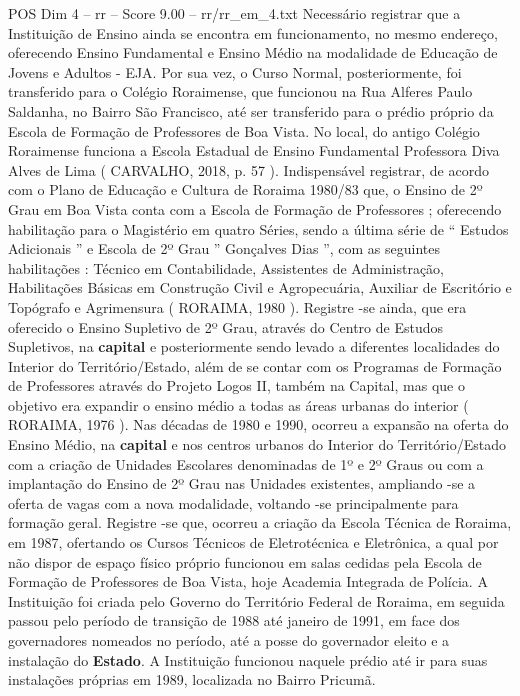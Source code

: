 \begin{textsample}{POS Dim 4 – rr – Score 9.00 – rr/rr\_em\_4.txt}
Necessário registrar que a Instituição de Ensino ainda se encontra em funcionamento, no mesmo endereço, oferecendo Ensino Fundamental e Ensino Médio na modalidade de Educação de Jovens e Adultos - EJA.
Por sua vez, o Curso Normal, posteriormente, foi transferido para o Colégio Roraimense, que funcionou na Rua Alferes Paulo Saldanha, no Bairro São Francisco, até ser transferido para o prédio próprio da Escola de Formação de Professores de Boa Vista.
No local, do antigo Colégio Roraimense funciona a Escola Estadual de Ensino Fundamental Professora Diva Alves de Lima ( CARVALHO, 2018, p. 57 ).
Indispensável registrar, de acordo com o Plano de Educação e Cultura de Roraima 1980/83 que, o Ensino de 2º Grau em Boa Vista conta com a Escola de Formação de Professores ; oferecendo habilitação para o Magistério em quatro Séries, sendo a última série de “ Estudos Adicionais ” e Escola de 2º Grau ” Gonçalves Dias ”, com as seguintes habilitações : Técnico em Contabilidade, Assistentes de Administração, Habilitações Básicas em Construção Civil e Agropecuária, Auxiliar de Escritório e Topógrafo e Agrimensura ( RORAIMA, 1980 ).
Registre -se ainda, que era oferecido o Ensino Supletivo de 2º Grau, através do Centro de Estudos Supletivos, na \textbf{capital} e posteriormente sendo levado a diferentes localidades do Interior do Território/Estado, além de se contar com os Programas de Formação de Professores através do Projeto Logos II, também na Capital, mas que o objetivo era expandir o ensino médio a todas as áreas urbanas do interior ( RORAIMA, 1976 ).
Nas décadas de 1980 e 1990, ocorreu a expansão na oferta do Ensino Médio, na \textbf{capital} e nos centros urbanos do Interior do Território/Estado com a criação de Unidades Escolares denominadas de 1º e 2º Graus ou com a implantação do Ensino de 2º Grau nas Unidades existentes, ampliando -se a oferta de vagas com a nova modalidade, voltando -se principalmente para formação geral.
Registre -se que, ocorreu a criação da Escola Técnica de Roraima, em 1987, ofertando os Cursos Técnicos de Eletrotécnica e Eletrônica, a qual por não dispor de espaço físico próprio funcionou em salas cedidas pela Escola de Formação de Professores de Boa Vista, hoje Academia Integrada de Polícia.
A Instituição foi criada pelo Governo do Território Federal de Roraima, em seguida passou pelo período de transição de 1988 até janeiro de 1991, em face dos governadores nomeados no período, até a posse do governador eleito e a instalação do \textbf{Estado}.
A Instituição funcionou naquele prédio até ir para suas instalações próprias em 1989, localizada no Bairro Pricumã.

\end{textsample}
